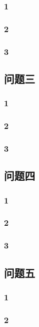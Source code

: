 \documentclass[UTF8]{ctexart}
\begin{document}
	\subsubsection{1}
	\subsubsection{2}
	\subsubsection{3}
	
	\subsection{问题三}
	\subsubsection{1}
	\subsubsection{2}
	\subsubsection{3}
	
	\subsection{问题四}
	\subsubsection{1}
	\subsubsection{2}
	\subsubsection{3}
	
	\subsection{问题五}
	\subsubsection{1}
	\subsubsection{2}
\end{document}
